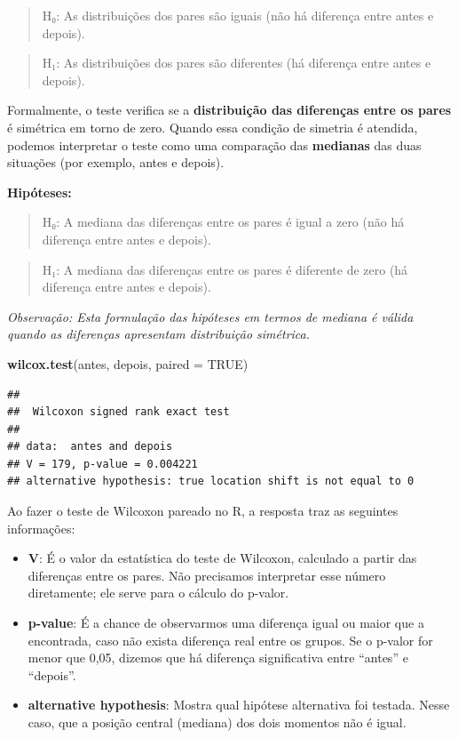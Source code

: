 \documentclass[
]{book}
\newenvironment{Shaded}{\begin{snugshade}}{\end{snugshade}}
\newcommand{\AttributeTok}[1]{\textcolor[rgb]{0.13,0.29,0.53}{#1}}
\newcommand{\ConstantTok}[1]{\textcolor[rgb]{0.56,0.35,0.01}{#1}}
\newcommand{\FunctionTok}[1]{\textcolor[rgb]{0.13,0.29,0.53}{\textbf{#1}}}
\newcommand{\NormalTok}[1]{#1}
\providecommand{\tightlist}{%
  \setlength{\itemsep}{0pt}\setlength{\parskip}{0pt}}
\begin{document}
\begin{quote}
H₀: As distribuições dos pares são iguais (não há diferença entre antes e depois).
\end{quote}

\begin{quote}
H₁: As distribuições dos pares são diferentes (há diferença entre antes e depois).
\end{quote}

Formalmente, o teste verifica se a \textbf{distribuição das diferenças entre os pares} é simétrica em torno de zero. Quando essa condição de simetria é atendida, podemos interpretar o teste como uma comparação das \textbf{medianas} das duas situações (por exemplo, antes e depois).

\textbf{Hipóteses:}

\begin{quote}
H₀: A mediana das diferenças entre os pares é igual a zero (não há diferença entre antes e depois).
\end{quote}

\begin{quote}
H₁: A mediana das diferenças entre os pares é diferente de zero (há diferença entre antes e depois).
\end{quote}

\emph{Observação: Esta formulação das hipóteses em termos de mediana é válida quando as diferenças apresentam distribuição simétrica.}

\begin{Shaded}
\begin{Highlighting}[]
\FunctionTok{wilcox.test}\NormalTok{(antes, depois, }\AttributeTok{paired =} \ConstantTok{TRUE}\NormalTok{)}
\end{Highlighting}
\end{Shaded}

\begin{verbatim}
## 
##  Wilcoxon signed rank exact test
## 
## data:  antes and depois
## V = 179, p-value = 0.004221
## alternative hypothesis: true location shift is not equal to 0
\end{verbatim}

Ao fazer o teste de Wilcoxon pareado no R, a resposta traz as seguintes informações:

\begin{itemize}
\tightlist
\item
  \textbf{V}: É o valor da estatística do teste de Wilcoxon, calculado a partir das diferenças entre os pares. Não precisamos interpretar esse número diretamente; ele serve para o cálculo do p-valor.
\item
  \textbf{p-value}: É a chance de observarmos uma diferença igual ou maior que a encontrada, caso não exista diferença real entre os grupos. Se o p-valor for menor que 0,05, dizemos que há diferença significativa entre ``antes'' e ``depois''.
\item
  \textbf{alternative hypothesis}: Mostra qual hipótese alternativa foi testada. Nesse caso, que a posição central (mediana) dos dois momentos não é igual.
\end{itemize}
\end{document}
